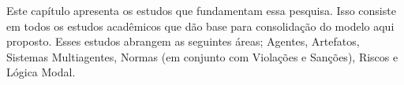 Este capítulo apresenta os estudos que fundamentam essa pesquisa. Isso consiste em todos os estudos acadêmicos que dão base para consolidação do modelo aqui proposto. Esses estudos abrangem as seguintes áreas; Agentes, Artefatos, Sistemas Multiagentes, Normas (em conjunto com Violações e Sanções), Riscos e Lógica Modal. 